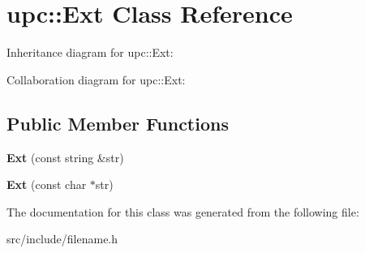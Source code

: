 \hypertarget{classupc_1_1Ext}{}\section{upc\+:\+:Ext Class Reference}
\label{classupc_1_1Ext}


Inheritance diagram for upc\+:\+:Ext\+:


Collaboration diagram for upc\+:\+:Ext\+:
\subsection*{Public Member Functions}
\begin{DoxyCompactItemize}
\item 
\mbox{\label{classupc_1_1Ext_af9636b92ecb5e6f5d0f16ae4d968c21a}} 
{\bfseries Ext} (const string \&str)
\item 
\mbox{\label{classupc_1_1Ext_a0e3b4b899d14b0bef3dbf566a38086ae}} 
{\bfseries Ext} (const char $\ast$str)
\end{DoxyCompactItemize}


The documentation for this class was generated from the following file\+:\begin{DoxyCompactItemize}
\item 
src/include/filename.\+h\end{DoxyCompactItemize}
